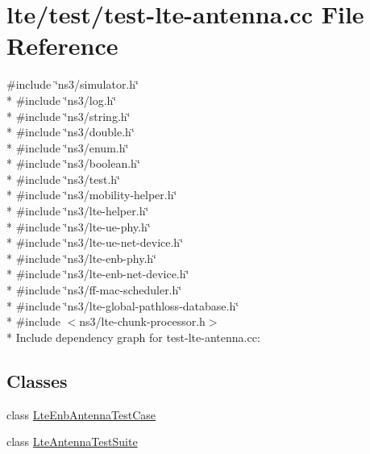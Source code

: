 \hypertarget{test-lte-antenna_8cc}{}\section{lte/test/test-\/lte-\/antenna.cc File Reference}
\label{test-lte-antenna_8cc}
{\ttfamily \#include \char`\"{}ns3/simulator.\+h\char`\"{}}\\*
{\ttfamily \#include \char`\"{}ns3/log.\+h\char`\"{}}\\*
{\ttfamily \#include \char`\"{}ns3/string.\+h\char`\"{}}\\*
{\ttfamily \#include \char`\"{}ns3/double.\+h\char`\"{}}\\*
{\ttfamily \#include \char`\"{}ns3/enum.\+h\char`\"{}}\\*
{\ttfamily \#include \char`\"{}ns3/boolean.\+h\char`\"{}}\\*
{\ttfamily \#include \char`\"{}ns3/test.\+h\char`\"{}}\\*
{\ttfamily \#include \char`\"{}ns3/mobility-\/helper.\+h\char`\"{}}\\*
{\ttfamily \#include \char`\"{}ns3/lte-\/helper.\+h\char`\"{}}\\*
{\ttfamily \#include \char`\"{}ns3/lte-\/ue-\/phy.\+h\char`\"{}}\\*
{\ttfamily \#include \char`\"{}ns3/lte-\/ue-\/net-\/device.\+h\char`\"{}}\\*
{\ttfamily \#include \char`\"{}ns3/lte-\/enb-\/phy.\+h\char`\"{}}\\*
{\ttfamily \#include \char`\"{}ns3/lte-\/enb-\/net-\/device.\+h\char`\"{}}\\*
{\ttfamily \#include \char`\"{}ns3/ff-\/mac-\/scheduler.\+h\char`\"{}}\\*
{\ttfamily \#include \char`\"{}ns3/lte-\/global-\/pathloss-\/database.\+h\char`\"{}}\\*
{\ttfamily \#include $<$ns3/lte-\/chunk-\/processor.\+h$>$}\\*
Include dependency graph for test-\/lte-\/antenna.cc\+:
\subsection*{Classes}
\begin{DoxyCompactItemize}
\item 
class \hyperlink{classLteEnbAntennaTestCase}{Lte\+Enb\+Antenna\+Test\+Case}
\item 
class \hyperlink{classLteAntennaTestSuite}{Lte\+Antenna\+Test\+Suite}
\end{DoxyCompactItemize}
